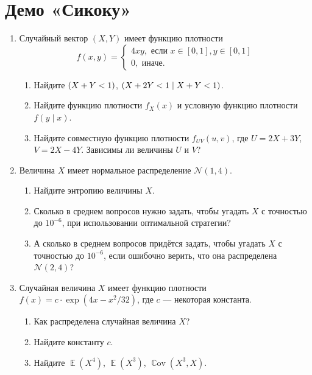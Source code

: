 \documentclass[12pt]{article}
\DeclareMathOperator{\Cov}{\mathbb{C}ov}
\let\P\relax
\DeclareMathOperator{\P}{\mathbb{P}}
\DeclareMathOperator{\E}{\mathbb{E}}
\newcommand \cN{\mathcal{N}}
\begin{document}
\section*{Демо «Сикоку»}

\begin{enumerate}
    \item %
    Случайный вектор $(X, Y)$ имеет функцию плотности 
    \[
    f(x, y) = \begin{cases}
        4xy, \text{ если } x\in[0,1], y \in [0, 1] \\
        0, \text{ иначе}.    
    \end{cases}
    \]
    \begin{enumerate}
        \item Найдите $\P(X + Y < 1)$, $\P(X + 2Y < 1 \mid X + Y < 1)$.
        \item Найдите функцию плотности $f_X(x)$ и условную функцию плотности $f(y\mid x)$.
        \item Найдите совместную функцию плотности $f_{UV}(u, v)$, где $U = 2X + 3Y$, $V = 2X - 4Y$.
    Зависимы ли величины $U$ и $V$?
    \end{enumerate}

    

\item %
Величина $X$ имеет нормальное распределение $\cN(1, 4)$.
\begin{enumerate}
    \item Найдите энтропию величины $X$.
    \item Сколько в среднем вопросов нужно задать, чтобы угадать $X$ с точностью до $10^{-6}$, при использовании оптимальной стратегии?
    \item А сколько в среднем вопросов придётся задать, чтобы угадать $X$ с точностью до $10^{-6}$, если ошибочно верить, что она распределена $\cN(2, 4)$?
\end{enumerate}



\item %
Случайная величина $X$ имеет функцию плотности $f(x) = c \cdot \exp(4x - x^2/32)$,
где $c$ — некоторая константа. 
\begin{enumerate}
    \item Как распределена случайная величина $X$?
    \item Найдите константу $c$.
    \item Найдите $\E(X^4)$, $\E(X^3)$, $\Cov(X^3, X)$.
\end{enumerate}


\end{enumerate}
\end{document}
